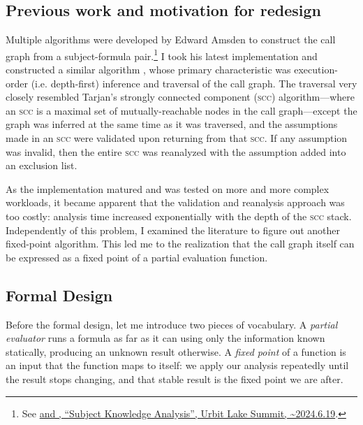 \documentclass[twoside]{article}
\begin{document}
\subsection{Previous work and motivation for redesign}

Multiple algorithms were developed by Edward Amsden  to construct the call graph from a subject-formula pair.\footnote{See \href{https://www.youtube.com/watch?v=z24zWdHfVfI}{ and , ``Subject Knowledge Analysis'', Urbit Lake Summit, \textasciitilde 2024.6.19}.} I took his latest implementation and constructed a similar algorithm \citep{ska-afonin}, whose primary characteristic was execution-order (i.e. depth-first) inference and traversal of the call graph. The traversal very closely resembled Tarjan's strongly connected component (\textsc{scc}) algorithm---where an \textsc{scc} is a maximal set of mutually-reachable nodes in the call graph---except the graph was inferred at the same time as it was traversed, and the assumptions made in an \textsc{scc} were validated upon returning from that \textsc{scc}. If any assumption was invalid, then the entire \textsc{scc} was reanalyzed with the assumption added into an exclusion list.

As the implementation matured and was tested on more and more complex workloads, it became apparent that the validation and reanalysis approach was too costly: analysis time increased exponentially with the depth of the \textsc{scc} stack.  Independently of this problem, I examined the literature to figure out another fixed-point algorithm. This led me to the realization that the call graph itself can be expressed as a fixed point of a partial evaluation function.

\subsection{Formal Design}

Before the formal design, let me introduce two pieces of vocabulary. A \emph{partial evaluator} runs a formula as far as it can using only the information known statically, producing an unknown result otherwise. A \emph{fixed point} of a function is an input that the function maps to itself: we apply our analysis repeatedly until the result stops changing, and that stable result is the fixed point we are after.
\end{document}
